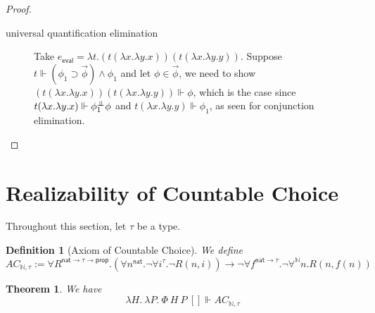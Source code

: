 \documentclass{article}
\newcommand{\N}{\mathbb{N}}
\newcommand{\nat}{\mathsf{nat}}
\newcommand{\depforall}[1]{\forall^\N #1.}
\newcommand{\pole}{{\bot\mkern-10mu\bot}}
\newcommand{\realizes}{\Vdash}
\newcommand{\prop}{\mathsf{prop}}
\newcommand{\eeval}{e_\mathsf{eval}}
\newtheorem{definition}{Definition}
\newtheorem{theorem}{Theorem}
\begin{document}
\begin{proof}
\begin{description}
        \item[universal quantification elimination] Take $\eeval = \lambda t. (t (\lambda x. \lambda y. x)) (t (\lambda x. \lambda y. y))$.
        Suppose $t \realizes (\phi_1 \supset \vec\phi) \wedge \phi_1$ and let $\phi \in \vec\phi$, we need to show $(t (\lambda x. \lambda y. x)) (t (\lambda x. \lambda y. y)) \realizes \phi$, which is the case since $t (\lambda x. \lambda y. x) \realizes \phi_1^\pole \phi$ and $t (\lambda x. \lambda y. y) \realizes \phi_1$, as seen for conjunction elimination.
    \end{description}
\end{proof}

\section{Realizability of Countable Choice}

Throughout this section, let $\tau$ be a type.
\begin{definition}[Axiom of Countable Choice]
    We define
    \[AC_{\N, \tau} := \forall R^{\nat \rightarrow \tau \rightarrow \prop}. (\forall n^\nat. \neg \forall i^\tau. \neg R(n, i)) \rightarrow \neg \forall f^{\nat \rightarrow \tau}. \neg \depforall{n} R(n, f(n))\]
\end{definition}

\begin{theorem} We have
    \[ \lambda H.\ \lambda P.\ \Phi\ H\ P\ [] \realizes AC_{\N, \tau} \]
\end{theorem}
\end{document}
